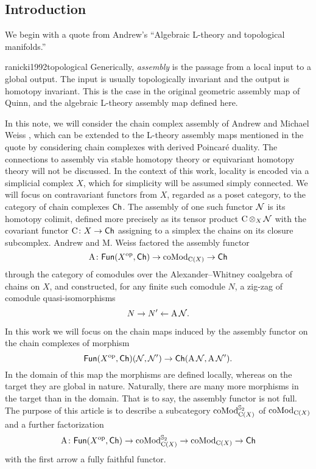 
\subsection{Introduction} \label{ss:introduction}

We begin with a quote from Andrew's ``Algebraic L-theory and topological manifolds.''
\begin{displaycquote}{ranicki1992topological}
	Generically, \textit{assembly} is the passage from a local input to a global output.
	The input is usually topologically invariant and the output is homotopy invariant.
	This is the case in the original geometric assembly map of Quinn, and the algebraic L-theory assembly map defined here.
\end{displaycquote}
In this note, we will consider the chain complex assembly of Andrew and Michael Weiss \cite{ranicki1990assembly}, which can be extended to the L-theory assembly maps mentioned in the quote by considering chain complexes with derived Poincar\'e duality.
The connections to assembly via stable homotopy theory \cite{weiss1995asssembly} or equivariant homotopy theory \cite{davis1998assembly} will not be discussed.
In the context of this work, locality is encoded via a simplicial complex $X$, which for simplicity will be assumed simply connected.
We will focus on contravariant functors from $X$, regarded as a poset category, to the category of chain complexes $\mathsf{Ch}$.
The assembly of one such functor $\mathcal{N}$ is its homotopy colimit, defined more precisely as its tensor product $\operatorname{C} \operatorname*{\otimes}_X \mathcal{N}$ with the covariant functor $\operatorname{C} \colon X \to \mathsf{Ch}$ assigning to a simplex the chains on its closure subcomplex.
Andrew and M. Weiss factored the assembly functor
\[
\operatorname{A} \colon \mathsf{Fun}(X^{\mathrm{op}}, \mathsf{Ch}) \to \operatorname{coMod}_{\operatorname{C}(X)} \to \mathsf{Ch}
\]
through the category of comodules over the Alexander--Whitney coalgebra of chains on $X$, and constructed, for any finite such comodule $N$, a zig-zag of comodule quasi-isomorphisms
\[
N \to N' \leftarrow \operatorname{A} \mathcal{N}.
\]

In this work we will focus on the chain maps induced by the assembly functor on the chain complexes of morphism
\[
\mathsf{Fun}(X^{\mathrm{op}},\mathsf{Ch})(\mathcal{N},\mathcal{N}') \to \mathsf{Ch}(\operatorname{A} \mathcal{N}, \operatorname{A} \mathcal{N}').
\]
In the domain of this map the morphisms are defined locally, whereas on the target they are global in nature.
Naturally, there are many more morphisms in the target than in the domain.
That is to say, the assembly functor is not full.
The purpose of this article is to describe a subcategory $\operatorname{coMod}^{\mathbb{S}_2}_{\operatorname{C}(X)}$ of $\operatorname{coMod}_{\operatorname{C}(X)}$ and a further factorization
\[
\operatorname{A} \colon \mathsf{Fun}(X^{\mathrm{op}}, \mathsf{Ch}) \to
\operatorname{coMod}^{\mathbb{S}_2}_{\operatorname{C}(X)} \to
\operatorname{coMod}_{\operatorname{C}(X)} \to
\mathsf{Ch}
\]
with the first arrow a fully faithful functor.


